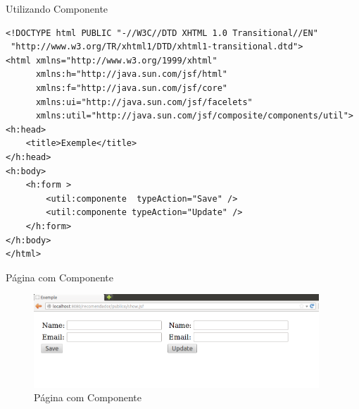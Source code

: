 \documentclass[xcolor=dvipsnames]{beamer}
\begin{document}
\begin{frame}[fragile]{Utilizando Componente}
	\begin{lstlisting}[style=HTML]
<!DOCTYPE html PUBLIC "-//W3C//DTD XHTML 1.0 Transitional//EN"
 "http://www.w3.org/TR/xhtml1/DTD/xhtml1-transitional.dtd"> 
<html xmlns="http://www.w3.org/1999/xhtml"
      xmlns:h="http://java.sun.com/jsf/html"
      xmlns:f="http://java.sun.com/jsf/core"
      xmlns:ui="http://java.sun.com/jsf/facelets"
      xmlns:util="http://java.sun.com/jsf/composite/components/util"> 
<h:head>
	<title>Exemple</title>
</h:head> 
<h:body> 
	<h:form >
		<util:componente  typeAction="Save" />
		<util:componente typeAction="Update" />
	</h:form>
</h:body> 
</html>
	\end{lstlisting}
\end{frame}

\begin{frame}{Página com Componente}
	\begin{figure}[!htb]
		\centering
		\includegraphics[keepaspectratio=true,height=3.5cm]{facelets-2rec.png}
		\caption{Página com Componente}
		\label{rec-ER}
\end{figure}

		\end{frame}




\end{document}
